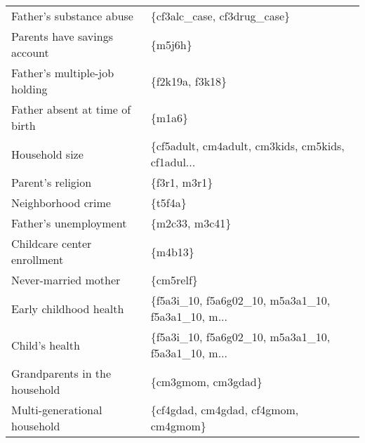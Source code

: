 \begin{tabular}{ll}
                     Father's substance abuse &                        \{cf3alc\_case, cf3drug\_case\} \\
                 Parents have savings account &                                            \{m5j6h\} \\
                Father's multiple-job holding &                                    \{f2k19a, f3k18\} \\
               Father absent at time of birth &                                             \{m1a6\} \\
                               Household size &  \{cf5adult, cm4adult, cm3kids, cm5kids, cf1adul... \\
                            Parent's religion &                                       \{f3r1, m3r1\} \\
                           Neighborhood crime &                                            \{t5f4a\} \\
                        Father's unemployment &                                     \{m2c33, m3c41\} \\
                  Childcare center enrollment &                                            \{m4b13\} \\
                         Never-married mother &                                          \{cm5relf\} \\
                       Early childhood health &  \{f5a3i\_10, f5a6g02\_10, m5a3a1\_10, f5a3a1\_10, m... \\
                               Child's health &  \{f5a3i\_10, f5a6g02\_10, m5a3a1\_10, f5a3a1\_10, m... \\
                Grandparents in the household &                                 \{cm3gmom, cm3gdad\} \\
                 Multi-generational household &               \{cf4gdad, cm4gdad, cf4gmom, cm4gmom\} \\
\bottomrule
\end{tabular}
